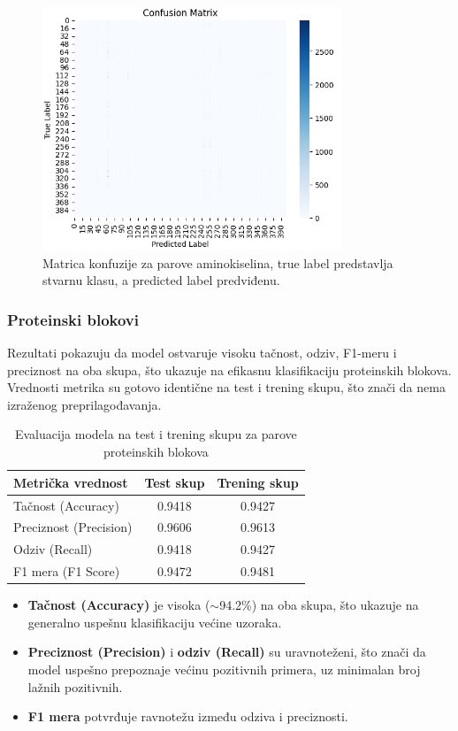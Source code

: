 \documentclass[a4paper,12pt]{article}
\begin{document}
\begin{figure}[htbp]
    \centering
    \includegraphics[width=0.8\textwidth]{./images/conf_mat_aa.png}
    \caption{Matrica konfuzije za parove aminokiselina, true label predstavlja stvarnu klasu, a predicted label predviđenu.}
    \label{Slika:confmataa}
\end{figure}

\subsubsection*{Proteinski blokovi}

Rezultati pokazuju da model ostvaruje visoku tačnost, odziv, F1-meru i preciznost na oba skupa, što ukazuje na efikasnu klasifikaciju proteinskih blokova. Vrednosti metrika su gotovo identične na test i trening skupu, što znači da nema izraženog preprilagođavanja.


\begin{table}[h!]
\centering
\caption{Evaluacija modela na test i trening skupu za parove proteinskih blokova}
\begin{tabular}{l|cc}
\textbf{Metrička vrednost} & \textbf{Test skup} & \textbf{Trening skup} \\
\hline
Tačnost (Accuracy)     & 0.9418 & 0.9427 \\
Preciznost (Precision) & 0.9606 & 0.9613 \\
Odziv (Recall)         & 0.9418 & 0.9427 \\
F1 mera (F1 Score)     & 0.9472 & 0.9481 \\
\end{tabular}
\end{table}


\begin{itemize}
    \item \textbf{Tačnost (Accuracy)} je visoka ($\sim$94.2\%) na oba skupa, što ukazuje na generalno uspešnu klasifikaciju većine uzoraka.
    \item \textbf{Preciznost (Precision)} i \textbf{odziv (Recall)} su uravnoteženi, što znači da model uspešno prepoznaje većinu pozitivnih primera, uz minimalan broj lažnih pozitivnih.
    \item \textbf{F1 mera} potvrđuje ravnotežu između odziva i preciznosti.
\end{itemize}
\end{document}
